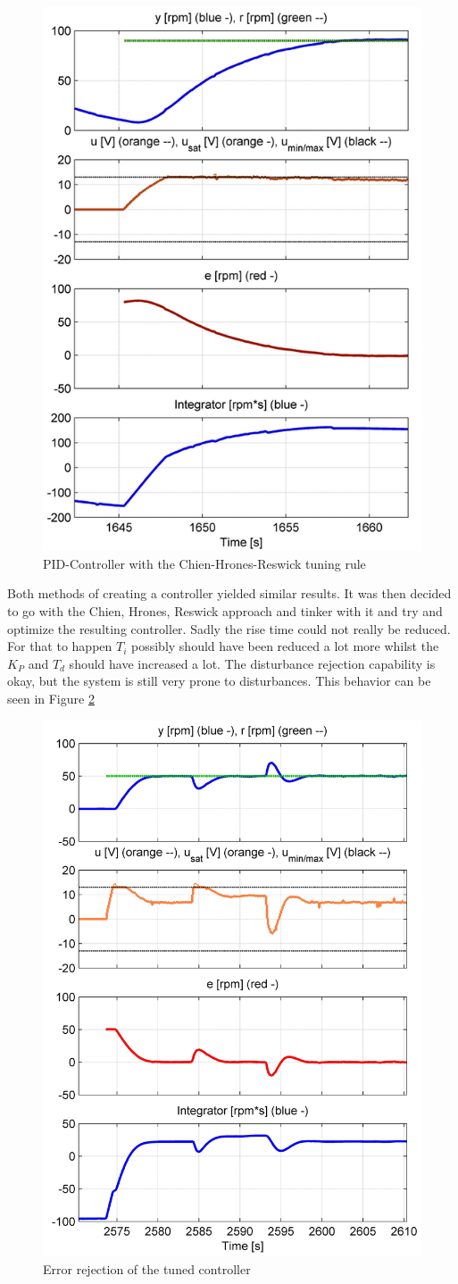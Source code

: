 \begin{figure}[H]
\begin{center}
\includegraphics[width=0.5\linewidth]{images/general/PID/Chien_Hrones_Reswick}
\end{center}
\caption{PID-Controller with the Chien-Hrones-Reswick tuning rule}
\label{fig:Chien_Hrones_Reswick}
\end{figure}

Both methods of creating a controller yielded similar results. It was then decided to go with the Chien, Hrones, Reswick approach and tinker with it and try and optimize the resulting controller.
Sadly the rise time could not really be reduced. For that to happen $T_i$ possibly should have been reduced a lot more whilst the $K_P$ and $T_d$ should have increased a lot.
The disturbance rejection capability is okay, but the system is still very prone to disturbances. This behavior can be seen in Figure \ref{fig:error_rejection}

\begin{figure}[H]
\begin{center}
\includegraphics[width=0.5\linewidth]{images/general/rejection}
\end{center}
\caption{Error rejection of the tuned controller}
\label{fig:error_rejection}
\end{figure}
\newpage
